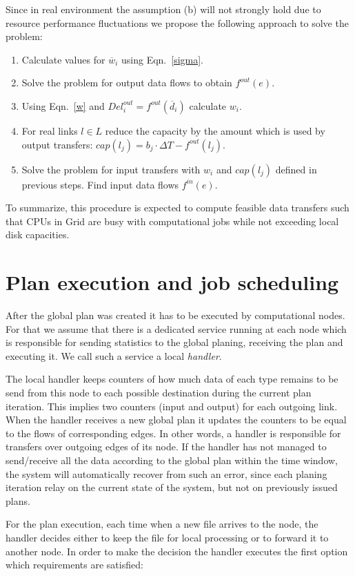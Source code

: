 \documentclass{svjour3}                     %
\begin{document}
Since in real environment the assumption (b) will not strongly hold due to
resource performance fluctuations we propose the following approach to
solve the problem:
%
\begin{enumerate}
\item Calculate values for $\overline{w}_{i}$ using Eqn.~\ref{sigma}.
\item Solve the problem for output data flows to obtain $f^{out}(e)$.
\item Using Eqn.~\ref{w} and $Del_{i}^{out} = f^{out}(\overline{d}_{i})$ calculate $w_{i}$.
\item For real links $l \in L$ reduce the capacity by the amount which is used by output transfers: $cap(l_{j}) = b_{j} \cdot \Delta T - f^{out}(l_{j})$.
\item Solve the problem for input transfers with $w_{i}$ and $cap(l_{j})$ defined in previous steps. Find input data flows $f^{in}(e)$.
\end{enumerate}
%
To summarize, this procedure is expected to compute feasible data transfers 
such that CPUs in Grid are busy with computational jobs while not exceeding 
local disk capacities.

\section{Plan execution and job scheduling}
\label{plan-execution}
After the global plan was created it has to be executed by computational
nodes. For that we assume that there is a dedicated service running at each node
which is responsible for sending statistics to the global planing, receiving the plan and executing it. We call such a service a local \textit{handler}.

The local handler keeps counters of how much data of each type remains to be send from this node to each  possible destination during the current plan iteration. This implies two counters (input and output) for each outgoing link. When the handler receives a new global plan it updates the counters to be equal to the flows of corresponding edges. In other words, a handler is responsible for transfers over outgoing edges of its node. If the handler has not managed to send/receive all the data according to the global plan within the time window, the system will automatically recover from such an error, since each planing iteration relay on the current state of the system, but not on previously issued plans.  

For the plan execution, each time when a new file arrives to the node, the handler decides either to keep the file for local processing or to forward it to another node. In order to make the decision the handler executes the first option which requirements are satisfied:
\end{document}
